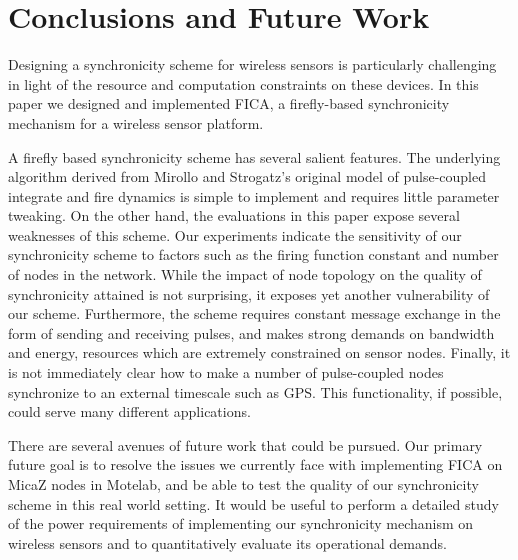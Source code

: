 \section{Conclusions and Future Work}
\label{sec:conclusion}

Designing a synchronicity scheme for wireless sensors
is particularly challenging in light of the resource and computation 
constraints on these devices. In this paper we
designed and implemented FICA, a firefly-based synchronicity mechanism 
for a wireless sensor platform.

A firefly based synchronicity scheme has several salient features.  
The underlying algorithm derived from Mirollo and Strogatz's original model 
of pulse-coupled integrate and fire dynamics is simple to implement and 
requires little parameter tweaking.  On the other hand, the evaluations
in this paper expose several weaknesses of this scheme. 
Our experiments indicate the sensitivity of our synchronicity scheme 
to factors such as the firing function constant and number of nodes in the network.
While the impact of node topology on the quality of synchronicity attained
is not surprising, it exposes yet another vulnerability of our scheme.
Furthermore, the scheme requires constant message exchange in the form 
of sending and receiving pulses, and makes strong demands on
bandwidth and energy, resources which are extremely constrained on sensor nodes.
Finally, it is not immediately clear how to make a number of pulse-coupled 
nodes synchronize to an external timescale such as GPS. This functionality,
if possible, could serve many different applications.

There are several avenues of future work that could be pursued. 
Our primary future goal is to resolve the issues we currently face with implementing
FICA on MicaZ nodes in Motelab, and be able to test the quality of our synchronicity
scheme in this real world setting.
It would be useful to perform a detailed study of the power requirements of 
implementing our synchronicity mechanism on wireless sensors and 
to quantitatively evaluate its operational demands.




